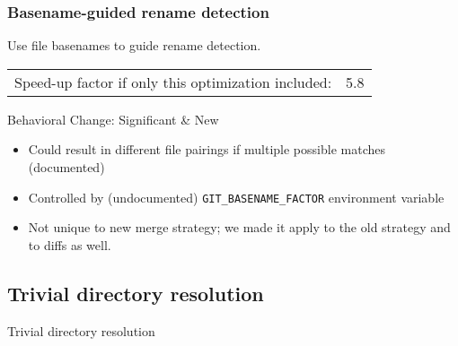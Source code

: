 \documentclass[compress,t]{beamer}
\begin{document}
\begin{frame}
  \frametitle{Basename-guided rename detection}

  Use file basenames to guide rename detection.

  \pause
  \vspace*{\baselineskip}
  \begin{tabular}{lr}
    Speed-up factor if only this optimization included:  & 5.8 \\
  \end{tabular}

  \vspace*{2\baselineskip}
  \pause
  {\scriptsize
  Behavioral Change: Significant \& New
  \pause
  \begin{itemize}
    \item Could result in different file pairings if multiple possible matches
          (documented)
    \pause
    \item Controlled by (undocumented) \texttt{GIT\_BASENAME\_FACTOR}
          environment variable
    \pause
    \item Not unique to new merge strategy; we made it apply to the old
          strategy and to diffs as well.
  \end{itemize}
  }

\end{frame}

\subsection[Directories]{Trivial directory resolution}

\begin{frame}
  \vfill
  \vspace*{2\baselineskip}
  {\Huge
  \begin{center}Trivial directory resolution\end{center}
  }
  \vfill
\end{frame}

\end{document}
